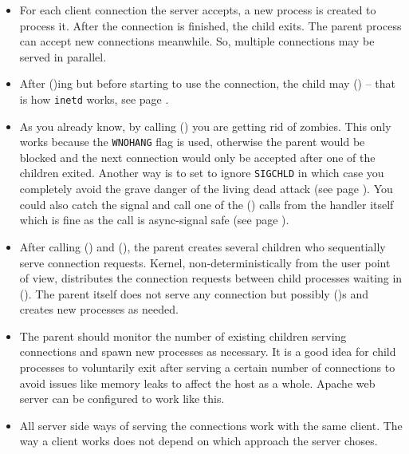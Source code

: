 
\begin{slide}

\end{slide}

\begin{itemize}
\item For each client connection the server accepts, a new process is created to
process it.  After the connection is finished, the child exits.  The parent
process can accept new connections meanwhile.  So, multiple connections may be
served in parallel.
\item After ()ing but before starting to use the connection, the
child may () -- that is how \texttt{inetd} works, see page
\pageref{INETD}.
\item As you already know, by calling () you are getting rid of
zombies. This only works because the \texttt{WNOHANG} flag is used,
otherwise the parent would be blocked and the next connection would only be
accepted after one of the children exited.
Another way is to set to ignore \texttt{SIGCHLD} in which case you
completely avoid the grave danger of the living dead attack (see page
\pageref{IGNORE_SIG_CHLD}).  You could also catch the signal and call
one of the () calls from the handler itself which is fine as the
call is async-signal safe (see page \pageref{ASYNCSIGNALSAFE}).
\end{itemize}


\begin{slide}

\end{slide}

\begin{itemize}
\item After calling () and (), the parent creates
several children who sequentially serve connection requests.  Kernel,
non-deterministically from the user point of view, distributes the connection
requests between child processes waiting in ().  The parent itself
does not serve any connection but possibly ()s and creates new
processes as needed.
\item The parent should monitor the number of existing children serving
connections and spawn new processes as necessary.
It is a good idea for child processes to voluntarily exit after serving a
certain number of connections to avoid issues like memory leaks to affect the
host as a whole. Apache web server can be configured to work like this.
\item All server side ways of serving the connections work with the same client.
The way a client works does not depend on which approach the server choses.
\end{itemize}


